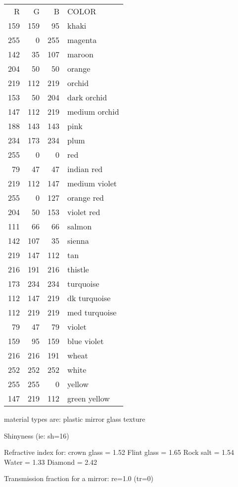 \begin{tabular}{r r r l}
R & G & B &         COLOR \\
159 & 159 & 95 & khaki  \\
255 & 0 & 255 & magenta \\
142 & 35 & 107 & maroon \\
204 & 50 & 50 & orange \\
219 & 112 & 219 & orchid \\
153 & 50 & 204 & dark orchid \\
147 & 112 & 219 & medium orchid \\
188 & 143 & 143 & pink \\
234 & 173 & 234 & plum \\
255 & 0 & 0 & red \\
79 & 47 & 47 & indian red \\
219 & 112 & 147 & medium violet \\
255 & 0 & 127 & orange red \\
204 & 50 & 153 & violet red \\
111 & 66 & 66 & salmon \\
142 & 107 & 35 & sienna \\
219 & 147 & 112 & tan \\
216 & 191 & 216 & thistle \\
173 & 234 & 234 & turquoise \\
112 & 147 & 219 & dk turquoise \\
112 & 219 & 219 & med turquoise \\
79 & 47 & 79 & violet \\
159 & 95 & 159 & blue violet \\
216 & 216 & 191 & wheat \\
252 & 252 & 252 & white \\
255 & 255 & 0 & yellow \\
147 & 219 & 112 & green yellow
\end{tabular}

material types are:  plastic
                               mirror
                               glass
                               texture

Shinyness (ie:  sh=16)

Refractive index for:  crown glass = 1.52
                              Flint glass = 1.65
                              Rock salt = 1.54
                              Water = 1.33
                              Diamond = 2.42

Transmission fraction for a mirror:  re=1.0 (tr=0)

